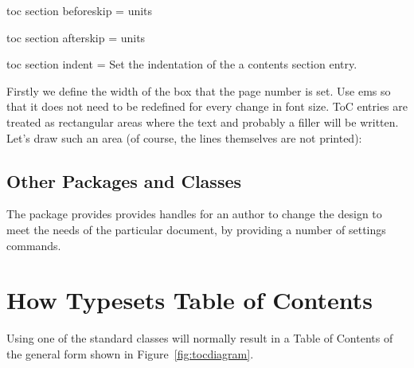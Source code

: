 \begin{docKey}[phd]{toc section beforeskip}{ = }{units}
\end{docKey}
\begin{docKey}[phd]{toc section afterskip}{ = }{units}
\end{docKey}
\begin{docKey}[phd]{toc section indent}{ = }{}
   Set the indentation of the a contents section entry. 
\end{docKey}


Firstly we define the width of the box that the page number is set. Use ems so that it does not need to be redefined for every change in font size.
ToC entries are treated as rectangular areas where the text
and probably a filler will be written. Let's draw such an
area (of course, the lines themselves are not printed):



\section{Other Packages and Classes}
The package  provides  provides handles for an author to change the design to meet the needs of the particular document, by providing a number of settings commands.



\chapter{How \latexe Typesets Table of Contents}

Using one of the standard \latexe classes will normally result in a Table of Contents of the general form shown in Figure~\ref{fig:tocdiagram}.

 \newcommand{\maxx}{120}       %
 \newcommand{\maxxm}{118}      %
 \newcommand{\maxy}{55}        %
 \newcommand{\maxym}{53}       %
 \newcommand{\findent}{20}     %
 \newcommand{\findentp}{22}    %
 \newcommand{\fnumwidth}{10}   %
 \newcommand{\ftocrmarg}{30}   %
 \newcommand{\fpnumwidth}{20}  %
 \newcommand{\fipn}{30}        %
 \newcommand{\frmarg}{90}      %
 \newcommand{\frnum}{100}      %
 \newcommand{\fyi}{10}         %
 \newcommand{\fyim}{8}         %
 \newcommand{\fyii}{20}        %
 \newcommand{\fyiii}{25}       %
 \newcommand{\fyiv}{30}        %
 \newcommand{\fyv}{40}         %
 \newcommand{\fyvp}{42}        %
 \newcommand{\flin}{4}         %
 \newcommand{\frmargm}{89}     %
 

